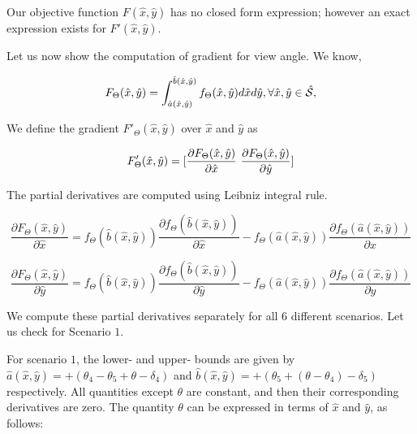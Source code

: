 Our objective function $F(\hat{x},\hat{y})$ has no closed form expression; however an exact expression exists for $F'(\hat{x},\hat{y})$.

Let us now show the computation of gradient for view angle. We know,

\begin{equation*}
\centering
F_{\Theta}(\hat{x},\hat{y}) = \int_{\hat{a}(\hat{x},\hat{y})}^{\hat{b}(\hat{x},\hat{y})} f_{\Theta}(\hat{x},\hat{y})d\hat{x} d\hat{y}, \forall \hat{x},\hat{y} \in \hat{\mathcal{S}},
\end{equation*}

We define the gradient $F'_{\Theta}(\hat{x},\hat{y})$ over $\hat{x}$ and $\hat{y}$ as 

\begin{equation*}
\centering
F'_{\Theta}(\hat{x},\hat{y}) =  [\frac{\partial F_{\Theta}(\hat{x},\hat{y})}{\partial \hat{x}} \mbox{   }\frac{\partial F_{\Theta}(\hat{x},\hat{y})}{\partial \hat{y}}]
\end{equation*}

The partial derivatives are computed using Leibniz integral rule.

\begin{equation*}
\frac{\partial F_{\Theta}(\hat{x},\hat{y})}{\partial \hat{x}} = f_{\Theta}(\hat{b}(\hat{x},\hat{y}))\frac{\partial f_{\Theta}(\hat{b}(\hat{x},\hat{y}))}{\partial \hat{x}} - f_{\Theta}(\hat{a}(\hat{x},\hat{y}))\frac{\partial f_{\Theta}(\hat{a}(\hat{x},\hat{y}))}{\partial \hat{x}}
\end{equation*}

\begin{equation*}
\frac{\partial F_{\Theta}(\hat{x},\hat{y})}{\partial \hat{y}} = f_{\Theta}(\hat{b}(\hat{x},\hat{y}))\frac{\partial f_{\Theta}(\hat{b}(\hat{x},\hat{y}))}{\partial \hat{y}} - f_{\Theta}(\hat{a}(\hat{x},\hat{y}))\frac{\partial f_{\Theta}(\hat{a}(\hat{x},\hat{y}))}{\partial \hat{y}}
\end{equation*}

We compute these partial derivatives separately for all $6$ different scenarios. Let us check for Scenario $1$.

For scenario $1$, the lower- and upper- bounds are given by $\hat{a}(\hat{x},\hat{y})=+(\theta_4 - \theta_5 + \theta - \delta_4)$ and $\hat{b}(\hat{x},\hat{y})=+(\theta_5 + (\theta - \theta_4) - \delta_5)$ respectively. All quantities except $\theta$ are constant, and then their corresponding derivatives are zero. The quantity $\theta$ can be expressed in terms of $\hat{x}$ and $\hat{y}$, as follows:

